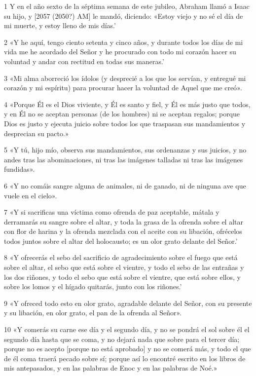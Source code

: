 \par 1 Y en el año sexto de la séptima semana de este jubileo, Abraham llamó a Isaac su hijo, y [2057 (2050?) AM] le mandó, diciendo: «Estoy viejo y no sé el día de mi muerte, y estoy lleno de mis días.'
\par 2 «Y he aquí, tengo ciento setenta y cinco años, y durante todos los días de mi vida me he acordado del Señor y he procurado con todo mi corazón hacer su voluntad y andar con rectitud en todas sus maneras.'
\par 3 «Mi alma aborreció los ídolos (y desprecié a los que los servían, y entregué mi corazón y mi espíritu) para procurar hacer la voluntad de Aquel que me creó».
\par 4 «Porque Él es el Dios viviente, y Él es santo y fiel, y Él es más justo que todos, y en Él no se aceptan personas (de los hombres) ni se aceptan regalos; porque Dios es justo y ejecuta juicio sobre todos los que traspasan sus mandamientos y desprecian su pacto.»
\par 5 «Y tú, hijo mío, observa sus mandamientos, sus ordenanzas y sus juicios, y no andes tras las abominaciones, ni tras las imágenes talladas ni tras las imágenes fundidas».
\par 6 «Y no comáis sangre alguna de animales, ni de ganado, ni de ninguna ave que vuele en el cielo».
\par 7 «Y si sacrificas una víctima como ofrenda de paz aceptable, mátala y derramarás su sangre sobre el altar, y toda la grasa de la ofrenda sobre el altar con flor de harina y la ofrenda mezclada con el aceite con su libación, ofrécelos todos juntos sobre el altar del holocausto; es un olor grato delante del Señor.'
\par 8 «Y ofrecerás el sebo del sacrificio de agradecimiento sobre el fuego que está sobre el altar, el sebo que está sobre el vientre, y todo el sebo de las entrañas y los dos riñones, y todo el sebo que está sobre el vientre, que está sobre ellos, y sobre los lomos y el hígado quitarás, junto con los riñones.'
\par 9 «Y ofreced todo esto en olor grato, agradable delante del Señor, con su presente y su libación, en olor grato, el pan de la ofrenda al Señor».
\par 10 «Y comerás su carne ese día y el segundo día, y no se pondrá el sol sobre él el segundo día hasta que se coma, y ​​no dejará nada que sobre para el tercer día; porque no es acepto [porque no está aprobado] y no se comerá más, y todo el que de él coma traerá pecado sobre sí; porque así lo encontré escrito en los libros de mis antepasados, y en las palabras de Enoc y en las palabras de Noé.»

